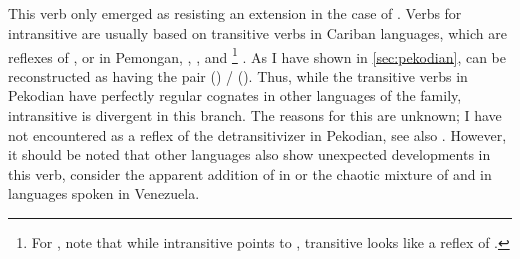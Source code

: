 \subsection{\PPek {} }
\label{sec:bathe}
This verb only emerged as resisting an extension in the case of \PPek {}.
Verbs for intransitive  are usually based on transitive verbs in Cariban languages, which are reflexes of , or  in Pemongan, \panare, \kalina, and \maqui\footnote{For \maqui, note that while intransitive  points to , transitive  looks like a reflex of .} .
As I have shown in \cref{sec:pekodian}, \PPek can be reconstructed as having the pair  () /  ().
Thus, while the transitive verbs in Pekodian have perfectly regular cognates in other languages of the family, intransitive  is divergent in this branch.
The reasons for this are unknown; I have not encountered  as a reflex of the detransitivizer in Pekodian, see also \textcite[506]{meira2010origin}.
However, it should be noted that other languages also show unexpected developments in this verb, consider the apparent addition of  in \hixka or the chaotic mixture of  and  in languages spoken in Venezuela.

